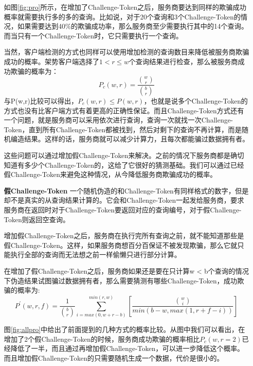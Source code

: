 如图\ref{fig:pro}所示，在增加了Challenge-Token之后，服务商要达到同样的欺骗成功概率就需要执行多的多的查询。比如说，对于20个查询和3个Challenge-Token的情况，如果需要达到40\%的欺骗成功率，那么服务商至少需要执行其中的14个查询。而当只有一个Challenge-Token时，它只需要执行一个查询。

当然，客户端检测的方式也同样可以使用增加检测的查询数目来降低被服务商欺骗成功的概率。架势客户端选择了$1 < r \le w$个查询结果进行检查，那么被服务商成功欺骗的概率为：
\begin{equation} P_c(w,r) = \frac{\binom{w}{r}}{\binom{b}{r}} \end{equation}
与P(w,r)比较可以得出，$P_c(w,r) \le P(w,r)$，也就是说多个Challenge-Token的方式也没有比客户端方式有着更高的正确性保证。而且Challenge-Token方式还有一个问题，就是服务商可以采用依次进行查询，查询一次就找一次Challenge-Token，直到所有Challenge-Token都被找到，然后对剩下的查询不再计算，而是随机编造结果。这样的话，服务商就可以减少计算力，且每次都能骗过数据拥有者。

这些问题可以通过增加假Challenge-Token来解决。之前的情况下服务商都是确切知道有多少个Challenge-Token的，这给了它很好的猜测基础。我们可以通过已经假Challenge-Token来避免这种情况，从今降低服务商欺骗成功的概率。

\textbf{假Challenge-Token} 一个随机伪造的和Challenge-Token有同样格式的数字，但是却不是真实的从查询结果计算的。它会和Challenge-Token一起发给服务商，要求服务商在返回时对于Challenge-Token要返回对应的查询编号，对于假Challenge-Token则返回空查询。

增加假Challenge-Token之后，服务商在执行完所有查询之前，就不能知道那些是假Challenge-Token。这样，如果服务商想百分百保证不被发现欺骗，那么它就只能执行全部的查询而无法想之前一样偷懒只进行部分计算。

在增加了假Challenge-Token之后，服务商如果还是要在只计算w < b个查询的情况下伪造结果试图骗过数据拥有者，那么需要猜测有哪些Challenge-Token，成功欺骗的概率为:
\begin{equation}P^\prime(w,r,f) = \frac{1}{\binom{b}{r}}\sum_{i=max(0,w+r-b)}^{min(r,w)}[\frac{\binom{w}{i}}{min(b-w,max(1,r+f-i))}]\end{equation}


图\ref{fig:allpro}中给出了前面提到的几种方式的概率比较。从图中我们可以看出，在增加了2个假Challenge-Token的时候，服务商成功欺骗的概率相比$P_c(w,r=2)$已经降低了一半，而且通过再增加假Challenge-Token，可以进一步降低这个概率。而且增加假Challenge-Token的只需要随机生成一个数据，代价是很小的。

